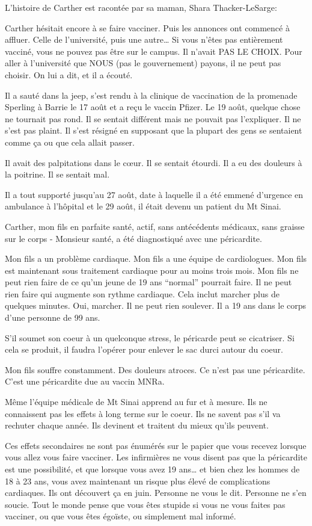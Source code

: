 L'histoire de Carther est racontée par sa maman, Shara Thacker-LeSarge:

Carther hésitait encore à se faire vacciner. Puis les annonces ont commencé à
affluer. Celle de l'université, puis une autre… Si vous n'êtes pas entièrement
vacciné, vous ne pouvez pas être sur le campus. Il n'avait PAS LE CHOIX. Pour
aller à l'université que NOUS (pas le gouvernement) payons, il ne peut pas
choisir. On lui a dit, et il a écouté.

Il a sauté dans la jeep, s'est rendu à la clinique de vaccination de la
promenade Sperling à Barrie le 17 août et a reçu le vaccin Pfizer. Le 19 août,
quelque chose ne tournait pas rond. Il se sentait différent mais ne pouvait pas
l'expliquer. Il ne s'est pas plaint. Il s'est résigné en supposant que la
plupart des gens se sentaient comme ça ou que cela allait passer.

Il avait des palpitations dans le cœur. Il se sentait étourdi. Il a eu des
douleurs à la poitrine. Il se sentait mal.

Il a tout supporté jusqu'au 27 août, date à laquelle il a été emmené d'urgence
en ambulance à l'hôpital et le 29 août, il était devenu un patient du Mt Sinai.

Carther, mon fils en parfaite santé, actif, sans antécédents médicaux, sans
graisse sur le corps - Monsieur santé, a été diagnostiqué avec une péricardite.

Mon fils a un problème cardiaque. Mon fils a une équipe de cardiologues. Mon
fils est maintenant sous traitement cardiaque pour au moins trois mois. Mon fils
ne peut rien faire de ce qu'un jeune de 19 ans “normal” pourrait faire. Il ne
peut rien faire qui augmente son rythme cardiaque. Cela inclut marcher plus de
quelques minutes. Oui, marcher. Il ne peut rien soulever. Il a 19 ans dans le
corps d'une personne de 99 ans.

S'il soumet son coeur à un quelconque stress, le péricarde peut se
cicatriser. Si cela se produit, il faudra l'opérer pour enlever le sac durci
autour du coeur.

Mon fils souffre constamment. Des douleurs atroces. Ce n'est pas une
péricardite. C'est une péricardite due au vaccin MNRa.

Même l'équipe médicale de Mt Sinai apprend au fur et à mesure. Ils ne
connaissent pas les effets à long terme sur le coeur. Ils ne savent pas s'il va
rechuter chaque année. Ils devinent et traitent du mieux qu'ils peuvent.

Ces effets secondaires ne sont pas énumérés sur le papier que vous recevez
lorsque vous allez vous faire vacciner. Les infirmières ne vous disent pas que
la péricardite est une possibilité, et que lorsque vous avez 19 ans… et bien
chez les hommes de 18 à 23 ans, vous avez maintenant un risque plus élevé de
complications cardiaques. Ils ont découvert ça en juin. Personne ne vous le
dit. Personne ne s'en soucie. Tout le monde pense que vous êtes stupide si vous
ne vous faites pas vacciner, ou que vous êtes égoïste, ou simplement mal
informé.

